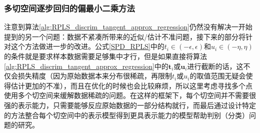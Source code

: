 \subsubsection{多切空间逐步回归的偏最小二乘方法}
\label{sec:muliti_tangent_rpls}
注意到算法\ref{alg:RPLS_discrim_tangent_approx_regression}仍然没有解决一开始提到的另一个问题：数据不紧凑所带来的近似/估计不准问题，接下来的部分将针对这个方法做进一步的改进。公式\ref{SPD_RPLS}中的$t_i \in (-\epsilon,\epsilon)$和$u_i \in (-\eta,\eta)$的条件就是要求样本数据需要足够集中才行，但是如果直接将算法\ref{alg:RPLS_discrim_tangent_approx_regression}中的$\bm{t}_i$或$\bm{u}_i$进行截断的话，这不仅会损失精度（因为原始数据本来分布很稀疏，再限制$t_i$或$u_i$的取值范围无疑会使得估计更加的不准），而且在优化的时候也会比较麻烦，所以这里考虑寻找多个点使用多个切空间来缓解数据稀疏的问题。在这样的框架下，每个切空间并不需要很强的表示能力，只需要能够反应原始数据的一部分结构就行，而最后通过设计特定的方法整合每个切空间中的表示模型得到更具表示能力的模型帮助判别（分类）问题的研究。

